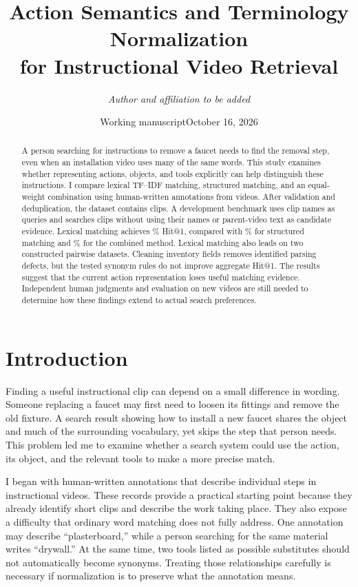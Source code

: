 \documentclass[11pt,letterpaper]{article}
\title{\vspace{-1.8em}\textbf{Action Semantics and Terminology Normalization\\for Instructional Video Retrieval}}
\author{\textit{Author and affiliation to be added}}
\date{Working manuscript\quad October 16, 2026}
\begin{document}
\maketitle
\thispagestyle{empty}
\begin{abstract}
A person searching for instructions to remove a faucet needs to find the
removal step, even when an installation video uses many of the same words.
This study examines whether representing actions, objects, and tools explicitly
can help distinguish these instructions. I compare lexical TF--IDF matching,
structured matching, and an equal-weight combination using human-written
annotations from \VideoCount{} videos. After validation and deduplication,
the dataset contains \ClipCount{} clips. A development benchmark uses
\QueryCount{} clip names as queries and searches \CandidateCount{} clips
without using their names or parent-video text as candidate evidence.
Lexical matching achieves \LexicalHitOne\% Hit@1, compared with
\StructuredHitOne\% for structured matching and \HybridHitOne\% for the
combined method. Lexical matching also leads on two constructed pairwise
datasets. Cleaning inventory fields removes identified parsing defects, but
the tested synonym rules do not improve aggregate Hit@1. The results suggest
that the current action representation loses useful matching evidence.
Independent human judgments and evaluation on new videos are still needed
to determine how these findings extend to actual search preferences.
\end{abstract}

\section{Introduction}
Finding a useful instructional clip can depend on a small difference in
wording. Someone replacing a faucet may first need to loosen its fittings
and remove the old fixture. A search result showing how to install a new
faucet shares the object and much of the surrounding vocabulary, yet skips
the step that person needs. This problem led me to examine whether a search
system could use the action, its object, and the relevant tools to make a
more precise match.

I began with human-written annotations that describe individual steps in
instructional videos. These records provide a practical starting point
because they already identify short clips and describe the work taking place.
They also expose a difficulty that ordinary word matching does not fully
address. One annotation may describe ``plasterboard,'' while a person searching
for the same material writes ``drywall.'' At the same time, two tools listed
as possible substitutes should not automatically become synonyms. Treating
those relationships carefully is necessary if normalization is to preserve
what the annotation means.
\end{document}
